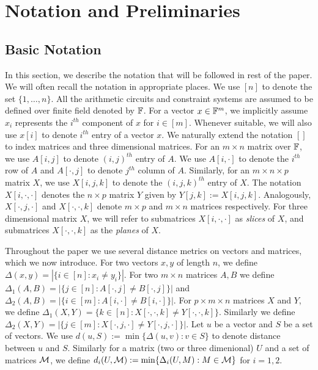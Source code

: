 \section{Notation and Preliminaries}\label{sec:prelims}
\subsection{Basic Notation}\label{sec:basicnotation}
In this section, we describe the notation that will be followed in rest of the
paper. We will often recall the notation in appropriate places. 
We use $[n]$ to
denote the set $\{1,\ldots,n\}$. All the arithmetic circuits and constraint
systems are assumed to be defined over finite field denoted by $\mathbb{F}$. For a
vector $x\in \mathbb{F}^m$, we implicitly assume $x_i$ represents the $i^{th}$
component of $x$ for $i\in [m]$. Whenever suitable, we will also use $x[i]$ to
denote $i^{th}$ entry of a vector $x$. We naturally extend the notation $[]$ to
index matrices and three dimensional matrices. For an $m\times n$ matrix over
$\mathbb{F}$, we use $A[i,j]$ to denote $(i,j)^{th}$ entry of $A$. We use $A[i,\cdot]$
to denote the $i^{th}$ row of $A$ and $A[\cdot,j]$ to denote $j^{th}$ column of
$A$. Similarly, for an $m\times n\times p$ matrix $X$, we use $X[i,j,k]$ to
denote the $(i,j,k)^{th}$ entry of $X$. The notation $X[i,\cdot,\cdot]$ denotes
the $n\times p$ matrix $Y$ given by $Y[j,k] := X[i,j,k]$. 
Analogously,
$X[\cdot,j,\cdot]$ and $X[\cdot,\cdot,k]$ denote $m\times p$ and $m\times n$
matrices respectively. For three dimensional
matrix $X$, we will refer to submatrices $X[i,\cdot,\cdot]$ as {\em slices} of
$X$, and submatrices $X[\cdot,\cdot,k]$ as the {\em planes} of $X$. 

Throughout the paper we use several distance metrics on vectors and matrices,
which we now introduce. For two vectors $x,y$ of length $n$, we define
$\Delta(x,y)=|\{i\in [n]: x_i\neq y_i\}|$. For two $m\times n$ matrices $A,B$ we
define $\Delta_1(A,B)=|\{j\in [n]: A[\cdot,j]\neq B[\cdot,j]\}|$ and
$\Delta_2(A,B)=|\{i\in [m]: A[i,\cdot]\neq B[i,\cdot]\}|$. For $p\times m\times
n$ matrices $X$ and $Y$, we define $\Delta_1(X,Y)=\{k\in
[n]:X[\cdot,\cdot,k]\neq Y[\cdot,\cdot,k]\}$. Similarly we define $\Delta_2(X,Y)
= |\{j\in [m]: X[\cdot,j,\cdot]\neq Y[\cdot,j,\cdot]\}|$. Let $u$ be a vector
and $S$ be a set of vectors. We use $d(u,S) := \min\{\Delta(u,v):v\in S\}$ to
denote distance between $u$ and $S$. Similarly for a matrix (two or three
dimenional) $U$ and a set of matrices $\mathcal{M}$, we define $d_i(U,\mathcal{M}) :=
\min\{\Delta_i(U,M): M\in \mathcal{M}\}$ for $i=1,2$.

